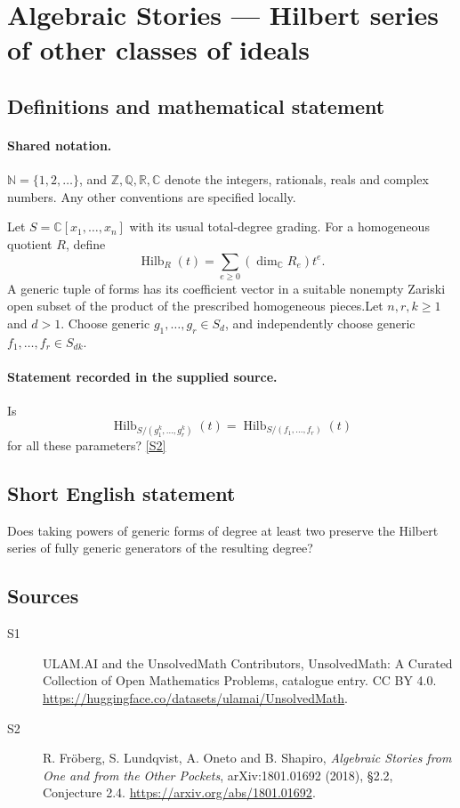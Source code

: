 \documentclass[11pt]{article}
\newcommand{\sref}[2]{\hyperlink{source:#1:#2}{[S#2]}}
\begin{document}
\section{Algebraic Stories — Hilbert series of other classes of ideals}\label{statement}

\subsection{Definitions and mathematical statement}

\paragraph{Shared notation.}$\mathbb N=\{1,2,\ldots\}$, and $\mathbb Z,\mathbb Q,\mathbb R,\mathbb C$ denote the integers, rationals, reals and complex numbers. Any other conventions are specified locally.


Let $S=\mathbb C[x_1,\ldots,x_n]$ with its usual total-degree grading. For a homogeneous quotient $R$, define
\[\operatorname{Hilb}_R(t)=\sum_{e\geq0}(\dim_{\mathbb C}R_e)t^e.
\]
A generic tuple of forms has its coefficient vector in a suitable nonempty Zariski open subset of the product of the prescribed homogeneous pieces.Let $n,r,k\geq1$ and $d>1$. Choose generic $g_1,\ldots,g_r\in S_d$, and independently choose generic $f_1,\ldots,f_r\in S_{dk}$.
\paragraph{Statement recorded in the supplied source.}
Is
\[\operatorname{Hilb}_{S/(g_1^k,\ldots,g_r^k)}(t)=\operatorname{Hilb}_{S/(f_1,\ldots,f_r)}(t)
\]
for all these parameters? \sref{statement}{2}
\subsection{Short English statement}
Does taking powers of generic forms of degree at least two preserve the Hilbert series of fully generic generators of the resulting degree?
\subsection{Sources}
\begin{description}
\item[\hypertarget{source:statement:1}{S1}] ULAM.AI and the UnsolvedMath Contributors, UnsolvedMath: A Curated Collection of Open Mathematics Problems, catalogue entry. CC BY 4.0. \url{https://huggingface.co/datasets/ulamai/UnsolvedMath}.
\item[\hypertarget{source:statement:2}{S2}] R. Fröberg, S. Lundqvist, A. Oneto and B. Shapiro, \emph{Algebraic Stories from One and from the Other Pockets}, arXiv:1801.01692 (2018), §2.2, Conjecture 2.4. \url{https://arxiv.org/abs/1801.01692}.
\end{description}
\label{end:statement}
\end{document}
